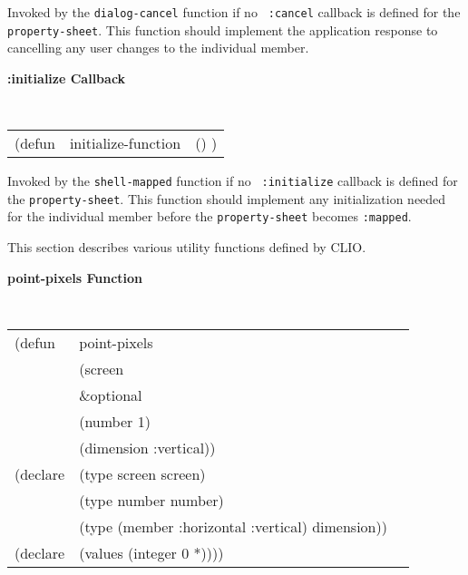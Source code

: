 \begin{flushright} \parbox[t]{6.125in}{
Invoked by the {\tt dialog-cancel} function if no {\tt
:cancel} callback is defined for the {\tt property-sheet}.
This function should implement the application response to cancelling any user
changes to the individual member.

}\end{flushright}

{\samepage
{\large {\bf :initialize \hfill Callback}} 
\begin{flushright} 
\parbox[t]{6.125in}{
\tt
\begin{tabular}{lll}
\raggedright
(defun & initialize-function & () )
\end{tabular}
\rm

}\end{flushright}}

\begin{flushright} \parbox[t]{6.125in}{
Invoked by the {\tt shell-mapped} function if no {\tt
:initialize} callback is defined for the {\tt property-sheet}.
This function should implement any initialization needed for the individual
member before the {\tt property-sheet} becomes {\tt :mapped}.

}\end{flushright}





This section describes various utility functions defined by CLIO.


{\samepage
{\large {\bf point-pixels \hfill Function}} 
\begin{flushright} 
\parbox[t]{6.125in}{
\tt
\begin{tabular}{lll}
\raggedright
(defun & point-pixels \\
       & (screen \\
       & \&optional \\
       & (number 1) \\
       & (dimension :vertical))\\
(declare & (type screen  screen)\\
	   &(type number  number)\\
	   &(type (member :horizontal :vertical)  dimension)) \\ 
(declare & (values (integer 0 *))))
\end{tabular}
\rm
}\end{flushright}}

